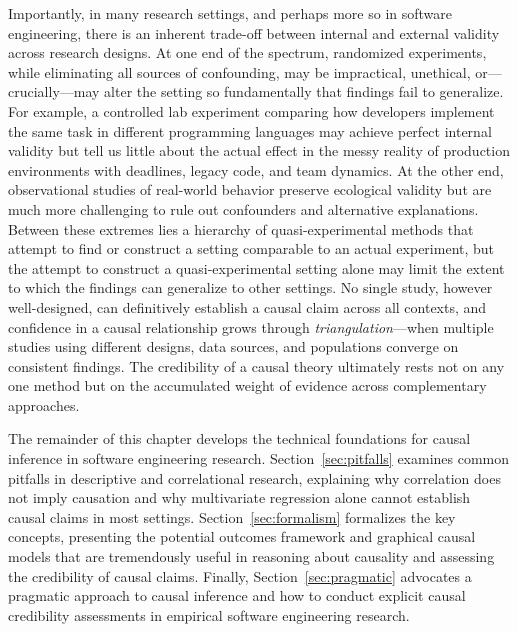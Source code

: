 Importantly, in many research settings, and perhaps more so in software engineering, there is an inherent trade-off between internal and external validity across research designs.
At one end of the spectrum, randomized experiments, while eliminating all sources of confounding, may be impractical, unethical, or---crucially---may alter the setting so fundamentally that findings fail to generalize.
For example, a controlled lab experiment comparing how developers implement the same task in different programming languages may achieve perfect internal validity but tell us little about the actual effect in the messy reality of production environments with deadlines, legacy code, and team dynamics.
At the other end, observational studies of real-world behavior preserve ecological validity but are much more challenging to rule out confounders and alternative explanations.
Between these extremes lies a hierarchy of quasi-experimental methods that attempt to find or construct a setting comparable to an actual experiment, but the attempt to construct a quasi-experimental setting alone may limit the extent to which the findings can generalize to other settings.  
No single study, however well-designed, can definitively establish a causal claim across all contexts, and confidence in a causal relationship grows through \emph{triangulation}---when multiple studies using different designs, data sources, and populations converge on consistent findings.
The credibility of a causal theory ultimately rests not on any one method but on the accumulated weight of evidence across complementary approaches.

The remainder of this chapter develops the technical foundations for causal inference in software engineering research.
Section~\ref{sec:pitfalls} examines common pitfalls in descriptive and correlational research, explaining why correlation does not imply causation and why multivariate regression alone cannot establish causal claims in most settings.
Section~\ref{sec:formalism} formalizes the key concepts, presenting the potential outcomes framework and graphical causal models that are tremendously useful in reasoning about causality and assessing the credibility of causal claims.
Finally, Section~\ref{sec:pragmatic} advocates a pragmatic approach to causal inference and how to conduct explicit causal credibility assessments in empirical software engineering research.


